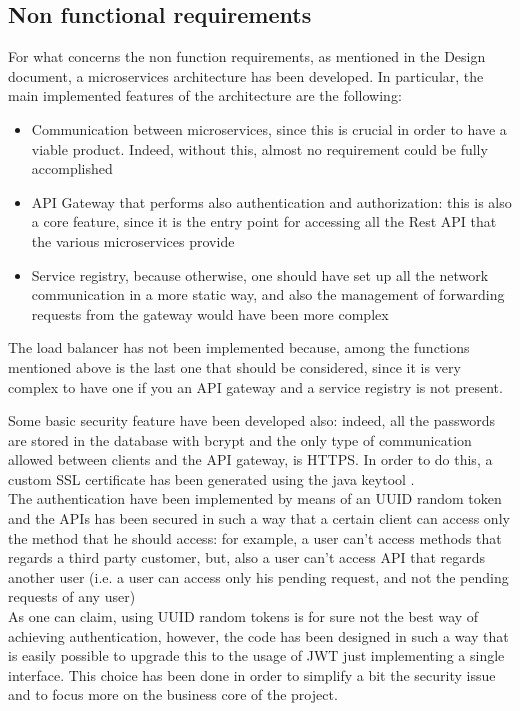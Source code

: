 \subsection{Non functional requirements}
For what concerns the non function requirements, as mentioned in the Design document, a microservices architecture has been developed. 
In particular, the main implemented features of the architecture are the following: 
\begin{itemize}
\item Communication between microservices, since this is crucial in order to have a viable product. Indeed, without this, almost no
requirement could be fully accomplished
\item API Gateway that performs also authentication and authorization: this is also a core feature, since it is the entry point for accessing
all the Rest API that the various microservices provide
\item Service registry, because otherwise, one should have set up all the network communication in a more static way, and also the management
of forwarding requests from the gateway would have been more complex 
\end{itemize}
The load balancer has not been implemented because, among the functions mentioned above is the last one that should be considered, since
it is very complex to have one if you an API gateway and a service registry is not present. \\

\par Some basic security feature have been developed also: indeed, all the passwords are stored in the database with bcrypt and the only type
of communication allowed between clients and the API gateway, is HTTPS. In order to do this, a custom SSL certificate has been
generated using the java keytool \cite{httpstool}.
\\
The authentication have been implemented by means of an UUID random token and the APIs has been secured in such a way that a certain client
can access only the method that he should access: for example, a user can't access methods that regards a third party customer, but, also
a user can't access API that regards another user (i.e. a user can access only his pending request, and not the pending requests of any
user) \\
As one can claim, using UUID random tokens is for sure not the best way of achieving authentication, however, the code has been designed
in such a way that is easily possible to upgrade this to the usage of JWT just implementing a single interface. This choice
has been done in order to simplify a bit the security issue and to focus more on the business core of the project. 

